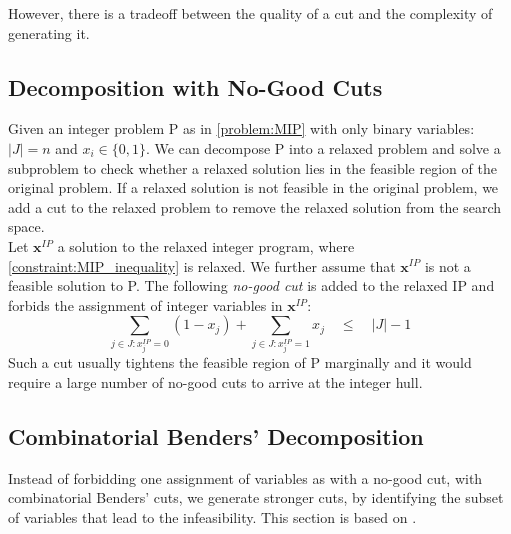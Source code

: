 However, there is a tradeoff between the quality of a cut and the complexity of generating it.


\subsection{Decomposition with No-Good Cuts}
Given an integer problem P as in \cref{problem:MIP} with only binary variables: $|J|=n$ and $x_i \in \{0,1\}$. 
We can decompose P into a relaxed problem and solve a subproblem to check whether a relaxed solution lies in the feasible region of the original problem. If a relaxed solution is not feasible in the original problem, we add a cut to the relaxed problem to remove the relaxed solution from the search space. \\
Let $\mathbf x^{IP}$ a solution to the relaxed integer program, where \cref{constraint:MIP_inequality} is relaxed. We further assume that $\mathbf x^{IP}$ is not a feasible solution to P. The following \textit{no-good cut} is added to the relaxed IP and forbids the assignment of integer variables in $\mathbf x^{IP}$:
\begin{equation*}
    \sum_{j \in J: x_j^{IP}=0} (1 - x_{j}) + \sum_{j \in J: x_j^{IP}=1} x_j \quad \leq \quad |J| -1
\end{equation*}
Such a cut usually tightens the feasible region of P marginally and it would require a large number of no-good cuts to arrive at the integer hull.

\subsection{Combinatorial Benders' Decomposition} \label{section:optimization_CB}
Instead of forbidding one assignment of variables as with a no-good cut, with combinatorial Benders' cuts, we generate stronger cuts, by identifying the subset of variables that lead to the infeasibility. This section is based on \cite{codato_combinatorial_2006}.

